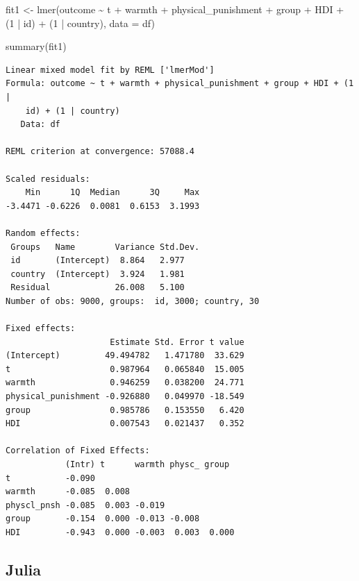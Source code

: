 \documentclass[
  letterpaper,
  DIV=11,
  numbers=noendperiod,
  oneside]{scrreprt}
\newenvironment{Shaded}{\begin{snugshade}}{\end{snugshade}}
\newcommand{\AttributeTok}[1]{\textcolor[rgb]{0.40,0.45,0.13}{#1}}
\newcommand{\DecValTok}[1]{\textcolor[rgb]{0.68,0.00,0.00}{#1}}
\newcommand{\FunctionTok}[1]{\textcolor[rgb]{0.28,0.35,0.67}{#1}}
\newcommand{\NormalTok}[1]{\textcolor[rgb]{0.00,0.23,0.31}{#1}}
\newcommand{\OtherTok}[1]{\textcolor[rgb]{0.00,0.23,0.31}{#1}}
\newcommand{\SpecialCharTok}[1]{\textcolor[rgb]{0.37,0.37,0.37}{#1}}
\begin{document}
\begin{Shaded}
\begin{Highlighting}[]
\NormalTok{fit1 }\OtherTok{\textless{}{-}} \FunctionTok{lmer}\NormalTok{(outcome }\SpecialCharTok{\textasciitilde{}}\NormalTok{ t }\SpecialCharTok{+}\NormalTok{ warmth }\SpecialCharTok{+}\NormalTok{ physical\_punishment }\SpecialCharTok{+} 
\NormalTok{               group }\SpecialCharTok{+}\NormalTok{ HDI }\SpecialCharTok{+}
\NormalTok{               (}\DecValTok{1} \SpecialCharTok{|}\NormalTok{ id) }\SpecialCharTok{+}
\NormalTok{               (}\DecValTok{1} \SpecialCharTok{|}\NormalTok{ country),}
             \AttributeTok{data =}\NormalTok{ df)}

\FunctionTok{summary}\NormalTok{(fit1)}
\end{Highlighting}
\end{Shaded}

\begin{verbatim}
Linear mixed model fit by REML ['lmerMod']
Formula: outcome ~ t + warmth + physical_punishment + group + HDI + (1 |  
    id) + (1 | country)
   Data: df

REML criterion at convergence: 57088.4

Scaled residuals: 
    Min      1Q  Median      3Q     Max 
-3.4471 -0.6226  0.0081  0.6153  3.1993 

Random effects:
 Groups   Name        Variance Std.Dev.
 id       (Intercept)  8.864   2.977   
 country  (Intercept)  3.924   1.981   
 Residual             26.008   5.100   
Number of obs: 9000, groups:  id, 3000; country, 30

Fixed effects:
                     Estimate Std. Error t value
(Intercept)         49.494782   1.471780  33.629
t                    0.987964   0.065840  15.005
warmth               0.946259   0.038200  24.771
physical_punishment -0.926880   0.049970 -18.549
group                0.985786   0.153550   6.420
HDI                  0.007543   0.021437   0.352

Correlation of Fixed Effects:
            (Intr) t      warmth physc_ group 
t           -0.090                            
warmth      -0.085  0.008                     
physcl_pnsh -0.085  0.003 -0.019              
group       -0.154  0.000 -0.013 -0.008       
HDI         -0.943  0.000 -0.003  0.003  0.000
\end{verbatim}

\subsection{Julia}
\end{document}

